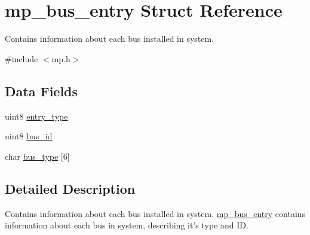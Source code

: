 \hypertarget{structmp__bus__entry}{
\section{mp\_\-bus\_\-entry Struct Reference}
\label{structmp__bus__entry}
}


Contains information about each bus installed in system.  




{\ttfamily \#include $<$mp.h$>$}

\subsection*{Data Fields}
\begin{DoxyCompactItemize}
\item 
uint8 \hyperlink{structmp__bus__entry_a8140c8c7b07812414d86746af40e9043}{entry\_\-type}
\item 
uint8 \hyperlink{structmp__bus__entry_abd8e48c419740a7c8dc96f0e34bad2fc}{bus\_\-id}
\item 
char \hyperlink{structmp__bus__entry_a302b64734336c1fb7bd4376a032f9358}{bus\_\-type} \mbox{[}6\mbox{]}
\end{DoxyCompactItemize}


\subsection{Detailed Description}
Contains information about each bus installed in system. \hyperlink{structmp__bus__entry}{mp\_\-bus\_\-entry} contains information about each bus in system, describing it's type and ID. 

